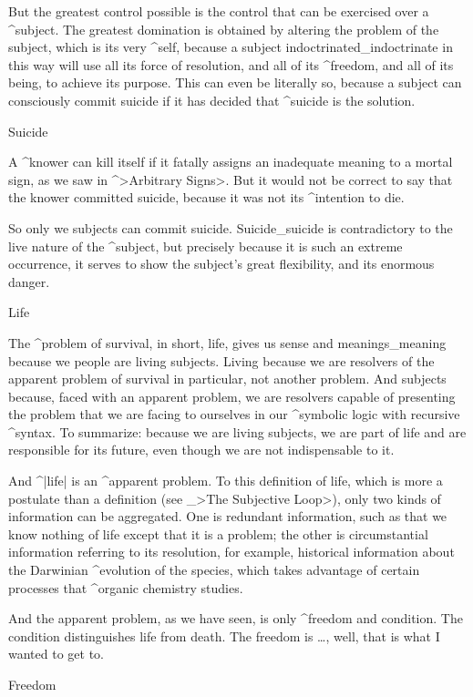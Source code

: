But the greatest control possible is the control that can be exercised
over a ^{subject}. The greatest domination is obtained by altering the
problem of the subject, which is its very ^{self}, because a subject
indoctrinated_{indoctrinate} in this way will use all its force of
resolution, and all of its ^{freedom}, and all of its being, to achieve
its purpose. This can even be literally so, because a subject can
consciously commit suicide if it has decided that ^{suicide} is the
solution.


\Section Suicide

A ^{knower} can kill itself if it fatally assigns an inadequate meaning
to a mortal sign, as we saw in ^>Arbitrary Signs>. But it would not be
correct to say that the knower committed suicide, because it was not its
^{intention} to die.

So only we subjects can commit suicide. Suicide_{suicide} is
contradictory to the live nature of the ^{subject}, but precisely
because it is such an extreme occurrence, it serves to show the
subject's great flexibility, and its enormous danger.


\Section Life

The ^{problem of survival}, in short, life, gives us sense and
meanings_{meaning} because we people are living subjects. Living because
we are resolvers of the apparent problem of survival in particular, not
another problem. And subjects because, faced with an apparent problem,
we are resolvers capable of presenting the problem that we are facing to
ourselves in our ^{symbolic logic} with recursive ^{syntax}. To
summarize: because we are living subjects, we are part of life and are
responsible for its future, even though we are not indispensable to it.

And ^|life| is an ^{apparent problem}. To this definition of life, which
is more a postulate than a definition (see _>The Subjective Loop>), only
two kinds of information can be aggregated. One is redundant
information, such as that we know nothing of life except that it is a
problem; the other is circumstantial information referring to its
resolution, for example, historical information about the Darwinian
^{evolution} of the species, which takes advantage of certain processes
that ^{organic chemistry} studies.

And the apparent problem, as we have seen, is only ^{freedom} and
condition. The condition distinguishes life from death. The freedom is
\dots, well, that is what I wanted to get to.


\Section Freedom

